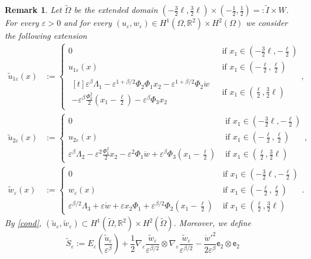 \documentclass[a4, 11pt, reqno, final]{amsart}
\newcommand{\bbR}{\mathbb{R}}
\newcommand\e{\varepsilon}
\theoremstyle{plain}%
\newtheorem{remark}[theorem]{Remark}
\begin{document}
	\begin{remark}\label{remarkext}
		Let $\widetilde{\Omega}$ be the extended domain $(-\frac{3}{2}\ell, \frac{3}{2}\ell)\times(-\frac12 ,\frac12 ) =: \widetilde{I} \times W$.
		For every $\e>0$ and for every $(u_\e, w_\e) \in H^1(\Omega, \bbR^2)\times H^2(\Omega)$ we consider the following extension
		\begin{align}
			\widetilde{u}_{1\e}(x) &:= \begin{cases}
				0 & \text{ if } x_1 \in (-\frac{3}{2}\ell, -\frac{\ell}{2})\\
				u_{1\e}(x) & \text{ if } x_1 \in (-\frac{\ell}{2}, \frac{\ell}{2})\\
				\begin{multlined}[t]\e^\beta\Lambda_1 - \e^{1+\beta/2}\Phi_2\Phi_1 x_2 - \e^{1+\beta/2}\Phi_2\mathring{w}\\ - \e^\beta\frac{\Phi_2^2}{2}(x_1-\frac{\ell}{2}) - \e^\beta\Phi_3 x_2 \end{multlined} & \text{ if } x_1 \in (\frac{\ell}{2}, \frac{3}{2}\ell)	\end{cases},\label{ext01}\\
			\widetilde{u}_{2\e}(x) &:= \begin{cases}
				0 & \text{ if } x_1 \in (-\frac{3}{2}\ell, -\frac{\ell}{2})\\
				u_{2\e}(x) & \text{ if } x_1 \in (-\frac{\ell}{2}, \frac{\ell}{2})\\
				\e^\beta \Lambda_2 - \e^2\frac{\Phi_1^2}{2} x_2 - \e^2\Phi_1\mathring{w} + \e^\beta\Phi_3 (x_1-\frac{\ell}{2}) & \text{ if } x_1 \in (\frac{\ell}{2}, \frac{3}{2}\ell) \end{cases},\label{ext02}\\
			\widetilde{w}_{\e}(x) &:= \begin{cases}
				0 & \text{ if } x_1 \in (-\frac{3}{2}\ell, -\frac{\ell}{2})\\
				w_{\e}(x) & \text{ if } x_1 \in (-\frac{\ell}{2}, \frac{\ell}{2})\\
				\e^{\beta/2}\Lambda_3 + \e\mathring{w} + \e x_2 \Phi_1 + \e^{\beta/2} \Phi_2(x_1-\frac{\ell}{2}) & \text{ if } x_1 \in (\frac{\ell}{2}, \frac{3}{2}\ell) \end{cases}.\label{ext03}
		\end{align}
		By \eqref{cond},  $(\widetilde{u}_{\e}, \widetilde{w}_\e) \subset H^1(\widetilde{\Omega},\bbR^2)\times H^2(\widetilde{\Omega})$.
		Moreover, we define
		\begin{equation}\label{defSetilde}
			\widetilde{S}_\e:= E_\e (\frac{\widetilde{u}_\e}{\e^\beta}) + \frac12 \nabla_\e \frac{\widetilde{w}_\e}{\e^{\beta/2}}\otimes \nabla_\e\frac{\widetilde{w}_\e}{\e^{\beta/2}} -  \frac{\mathring{w}'^2}{2\e^\beta} \mathsf{e}_2 \otimes \mathsf{e}_2\end{equation}

\end{remark}
\end{document}
